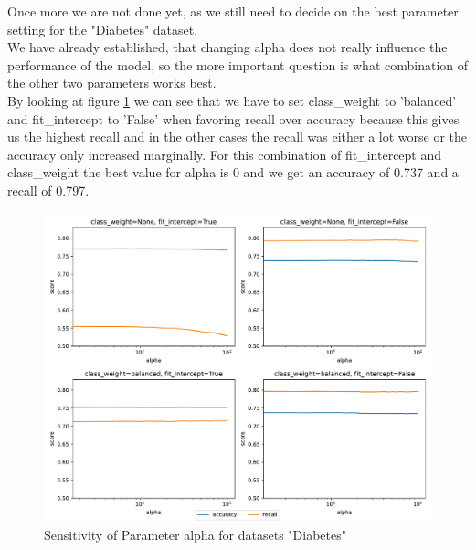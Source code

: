 \documentclass[a4paper,10pt]{article}
\begin{document}
Once more we are not done yet, as we still need to decide on the best parameter setting for the "Diabetes" dataset.\\
We have already established, that changing \textsf{alpha} does not really influence the performance of the model, so the more important question is what combination of the other two parameters works best.\\
By looking at figure \ref{fig:sensitivity ridge diabetes} we can see that we have to set \textsf{class\_weight} to 'balanced' and \textsf{fit\_intercept} to 'False' when favoring recall over accuracy because this gives us the highest recall and in the other cases the recall was either a lot worse or the accuracy only increased marginally. For this combination of \textsf{fit\_intercept} and \textsf{class\_weight} the best value for alpha is 0 and we get an accuracy of 0.737 and a recall of 0.797.%

\begin{figure}[h!]
    \centering
    \includegraphics[width=\textwidth]{diabetes/plots/ridge_parameter_sensitivity.pdf}
    \caption{Sensitivity of Parameter alpha for datasets "Diabetes"}
    \label{fig:sensitivity ridge diabetes}
    \end{figure}
\end{document}

